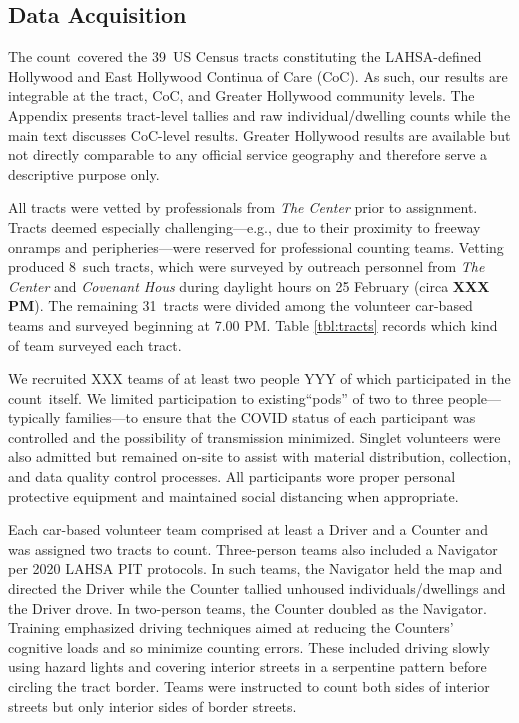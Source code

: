 \documentclass[11pt,twocolumn]{article}
\def\bfr{\bf\color{red}}
\def\Count{count}
\def\ntracts{39}
\def\nprof{8}
\def\nvol{31}
\begin{document}
\subsection{Data Acquisition}
\label{sec:acquisition}

The \Count\ covered the \ntracts\ US Census tracts constituting the LAHSA-defined Hollywood 
and East Hollywood Continua of Care (CoC). As such, our results are integrable at the tract, CoC, 
and Greater Hollywood community levels. The Appendix presents tract-level tallies and raw
individual/dwelling counts while the main text discusses CoC-level results. Greater Hollywood 
results are available but not directly comparable to any official service geography and therefore
serve a descriptive purpose only.

All tracts were vetted by professionals from {\it The Center} prior to assignment. Tracts deemed 
especially challenging---e.g., due to their proximity to freeway onramps and peripheries---were 
reserved for professional counting teams. Vetting produced \nprof\ such tracts, which were surveyed 
by outreach personnel from {\it The Center} and {\it Covenant Hous} during daylight hours on 25 
February (circa {\bfr XXX PM}). The remaining \nvol\ tracts were divided among the volunteer 
car-based teams and surveyed beginning at 7.00 PM. Table \ref{tbl:tracts} records which kind of team 
surveyed each tract.

We recruited XXX teams of at least two people YYY of which participated in the \Count\ itself. We 
limited participation to existing``pods'' of two to three people---typically families---to ensure that the 
COVID status of each participant was controlled and the possibility of transmission minimized. 
Singlet volunteers were also admitted but remained on-site to assist with material distribution, 
collection, and data quality control processes. All participants wore proper personal protective 
equipment and maintained social distancing when appropriate.

Each car-based volunteer team comprised at least a Driver and a Counter and was assigned two tracts 
to count. Three-person teams also included a Navigator per 2020 LAHSA PIT protocols. In such teams, 
the Navigator held the map and directed the Driver while the Counter tallied unhoused individuals/dwellings 
and the Driver drove. In two-person teams, the Counter doubled as the Navigator. Training emphasized 
driving techniques aimed at reducing the Counters' cognitive loads and so minimize counting errors. 
These included driving slowly using hazard lights and covering interior streets in a serpentine pattern 
before circling the tract border. Teams were instructed to count both sides of interior streets but only
interior sides of border streets.
\end{document}
